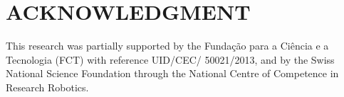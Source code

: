 \documentclass[letterpaper, 10 pt, conference]{ieeeconf}  %
\begin{document}








\section*{ACKNOWLEDGMENT}
This research was partially supported by the Funda\c{c}\~{a}o para a Ci\^{e}ncia
e a Tecnologia (FCT) with reference UID/CEC/ 50021/2013, and by the Swiss
National Science Foundation through the National Centre of Competence in
Research Robotics.






\small


\end{document}
